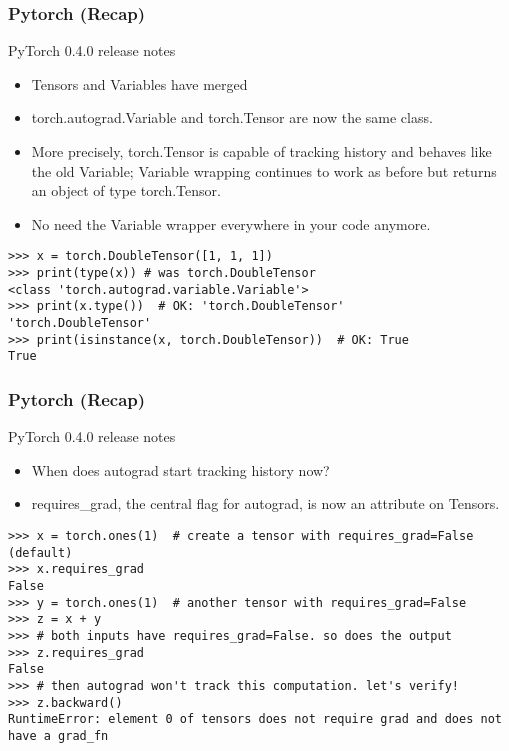  
\begin{frame}[fragile]
\frametitle{Pytorch (Recap)}
PyTorch 0.4.0 release notes
\begin{itemize}
\item Tensors and Variables have merged
\item torch.autograd.Variable and torch.Tensor are now the same class. 
\item More precisely, torch.Tensor is capable of tracking history and behaves like the old Variable; Variable wrapping continues to work as before but returns an object of type torch.Tensor. \item No need the Variable wrapper everywhere in your code anymore.
\end{itemize}
 \begin{lstlisting}
>>> x = torch.DoubleTensor([1, 1, 1])
>>> print(type(x)) # was torch.DoubleTensor
<class 'torch.autograd.variable.Variable'>
>>> print(x.type())  # OK: 'torch.DoubleTensor'
'torch.DoubleTensor'
>>> print(isinstance(x, torch.DoubleTensor))  # OK: True
True
 \end{lstlisting}
 \end{frame} 
 
\begin{frame}[fragile]
\frametitle{Pytorch (Recap)}
PyTorch 0.4.0 release notes
\begin{itemize}
\item When does autograd start tracking history now?
\item requires\_grad, the central flag for autograd, is now an attribute on Tensors.
\end{itemize}
 \begin{lstlisting}
>>> x = torch.ones(1)  # create a tensor with requires_grad=False (default)
>>> x.requires_grad
False
>>> y = torch.ones(1)  # another tensor with requires_grad=False
>>> z = x + y
>>> # both inputs have requires_grad=False. so does the output
>>> z.requires_grad
False
>>> # then autograd won't track this computation. let's verify!
>>> z.backward()
RuntimeError: element 0 of tensors does not require grad and does not have a grad_fn
 \end{lstlisting}
 \end{frame} 
 

